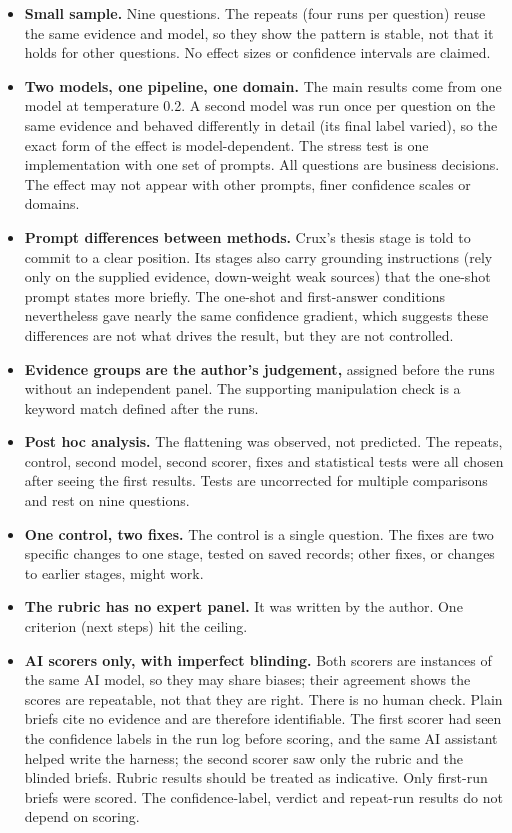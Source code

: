 \documentclass[11pt]{article}
\newcommand{\crux}{Crux}
\begin{document}
\begin{itemize}
\item \textbf{Small sample.} Nine questions. The repeats (four runs per question) reuse the same evidence and model, so they show the pattern is stable, not that it holds for other questions. No effect sizes or confidence intervals are claimed.
\item \textbf{Two models, one pipeline, one domain.} The main results come from one model at temperature 0.2. A second model was run once per question on the same evidence and behaved differently in detail (its final label varied), so the exact form of the effect is model-dependent. The stress test is one implementation with one set of prompts. All questions are business decisions. The effect may not appear with other prompts, finer confidence scales or domains.
\item \textbf{Prompt differences between methods.} \crux{}'s thesis stage is told to commit to a clear position. Its stages also carry grounding instructions (rely only on the supplied evidence, down-weight weak sources) that the one-shot prompt states more briefly. The one-shot and first-answer conditions nevertheless gave nearly the same confidence gradient, which suggests these differences are not what drives the result, but they are not controlled.
\item \textbf{Evidence groups are the author's judgement,} assigned before the runs without an independent panel. The supporting manipulation check is a keyword match defined after the runs.
\item \textbf{Post hoc analysis.} The flattening was observed, not predicted. The repeats, control, second model, second scorer, fixes and statistical tests were all chosen after seeing the first results. Tests are uncorrected for multiple comparisons and rest on nine questions.
\item \textbf{One control, two fixes.} The control is a single question. The fixes are two specific changes to one stage, tested on saved records; other fixes, or changes to earlier stages, might work.
\item \textbf{The rubric has no expert panel.} It was written by the author. One criterion (next steps) hit the ceiling.
\item \textbf{AI scorers only, with imperfect blinding.} Both scorers are instances of the same AI model, so they may share biases; their agreement shows the scores are repeatable, not that they are right. There is no human check. Plain briefs cite no evidence and are therefore identifiable. The first scorer had seen the confidence labels in the run log before scoring, and the same AI assistant helped write the harness; the second scorer saw only the rubric and the blinded briefs. Rubric results should be treated as indicative. Only first-run briefs were scored. The confidence-label, verdict and repeat-run results do not depend on scoring.

\end{itemize}
\end{document}
